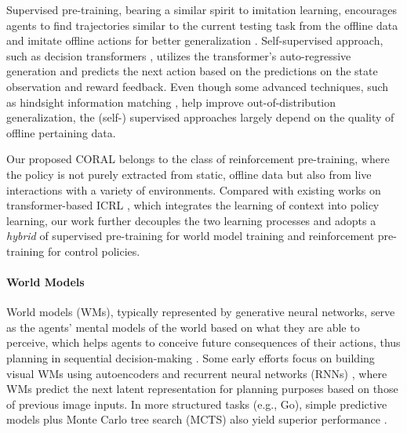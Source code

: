 \documentclass[letterpaper]{article} %
\begin{document}
Supervised pre-training, bearing a similar spirit to imitation learning, encourages agents to find trajectories similar to the current testing task from the offline data and imitate offline actions for better generalization \cite{raparthy24icrl, xu22prompt-dt}. Self-supervised approach, such as decision transformers \cite{chen2021dt, huang2024decision}, utilizes the transformer's auto-regressive generation and predicts the next action based on the predictions on the state observation and reward feedback. Even though some advanced techniques, such as hindsight information matching \cite{furuta21generalDT, tao23sce}, help improve out-of-distribution generalization, the (self-) supervised approaches largely depend on the quality of offline pertaining data. 

Our proposed CORAL belongs to the class of reinforcement pre-training, where the policy is not purely extracted from static, offline data but also from live interactions with a variety of environments. Compared with existing works on transformer-based ICRL \cite{bauer23,grigsby2024amago,  wang2024transformers}, which integrates the learning of context into policy learning, our work further decouples the two learning processes and adopts a \textit{hybrid} of supervised pre-training for world model training and reinforcement pre-training for control policies. 

\paragraph{World Models}
World models (WMs), typically represented by generative neural networks, serve as the agents' mental models of the world based on what they are able to perceive, which helps agents to conceive future consequences of their actions, thus planning in sequential decision-making \cite{schmidhuber18wm}. Some early efforts focus on building visual WMs using autoencoders and recurrent neural networks (RNNs) \cite{schmidhuber18wm,hafner19a, hafnerdream, hafner25worldmodel}, where WMs predict the next latent representation for planning purposes based on those of previous image inputs. In more structured tasks (e.g., Go),  simple predictive models plus Monte Carlo tree search (MCTS) also yield superior performance \cite{silver20wm, silver21on-off-wm, tao24col, kim-tao25col}. 
\end{document}
